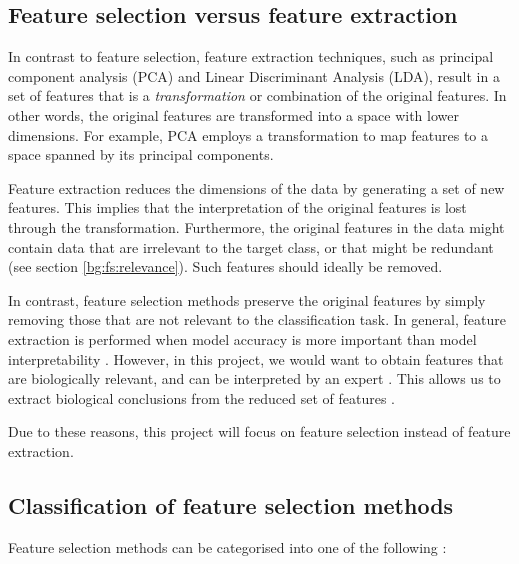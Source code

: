 \documentclass[12pt, twoside, a4paper]{report}
\begin{document}
\subsection{Feature selection versus feature extraction} \label{bg:fs:extraction}

In contrast to feature selection, feature extraction techniques, such as principal component analysis (PCA) and Linear Discriminant Analysis (LDA), result in a set of features that is a \textit{transformation} or combination of the original features. In other words, the original features are transformed into a space with lower dimensions. For example, PCA employs a transformation to map features to a space spanned by its principal components.

Feature extraction reduces the dimensions of the data by generating a set of new features. This implies that the interpretation of the original features is lost through the transformation. Furthermore, the original features in the data might contain data that are irrelevant to the target class, or that might be redundant (see section \ref{bg:fs:relevance}). Such features should ideally be removed.

In contrast, feature selection methods preserve the original features by simply removing those that are not relevant to the classification task. In general, feature extraction is performed when model accuracy is more important than model interpretability \cite{RefWorks:163}. However, in this project, we would want to obtain features that are biologically relevant, and can be interpreted by an expert \cite{RefWorks:192}. This allows us to extract biological conclusions from the reduced set of features \cite{RefWorks:142}.

Due to these reasons, this project will focus on feature selection instead of feature extraction.

\subsection{Classification of feature selection methods} \label{bg:fs:classification}

Feature selection methods can be categorised into one of the following \cite{RefWorks:117, RefWorks:118}:
\end{document}
